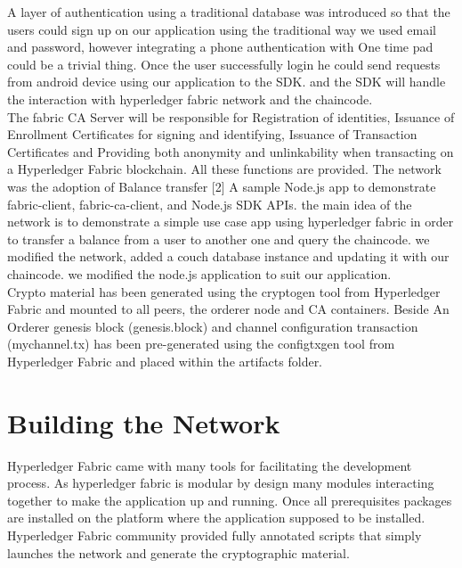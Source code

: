 A layer of authentication using a traditional database was introduced so that the users could sign up on our application using the traditional way we used email and password, however integrating a phone authentication with One time pad could be a trivial thing. 
Once the user successfully login he could send requests from android device using our application to the SDK. and the SDK will handle the interaction with hyperledger fabric network and the chaincode. \\
 
The fabric CA Server will be responsible for Registration of identities, Issuance of Enrollment Certificates for signing and identifying, Issuance of Transaction Certificates and Providing both anonymity and unlinkability when transacting on a Hyperledger Fabric blockchain. All these functions are provided.
The network was the adoption of Balance transfer [2] A sample Node.js app to demonstrate fabric-client, fabric-ca-client, and Node.js SDK APIs. 
the main idea of the network is to demonstrate a simple use case app using hyperledger fabric in order to transfer a balance from a user to another one and query the chaincode. we modified the network, added a couch database instance and updating it with our chaincode. we modified the node.js application to suit our application. \\ 

Crypto material has been generated using the cryptogen tool from Hyperledger Fabric and mounted to all peers, the orderer node and CA containers. 
Beside An Orderer genesis block (genesis.block) and channel configuration transaction (mychannel.tx) has been pre-generated using the configtxgen tool from Hyperledger Fabric and placed within the artifacts folder. 

\section{Building the Network} 

Hyperledger Fabric came with many tools for facilitating the development process. As hyperledger fabric is modular by design many modules interacting together to make the application up and running.  
Once all prerequisites packages are installed on the platform where the application supposed to be installed. Hyperledger Fabric community provided fully annotated scripts that simply launches the network and generate the cryptographic material. \\ 

